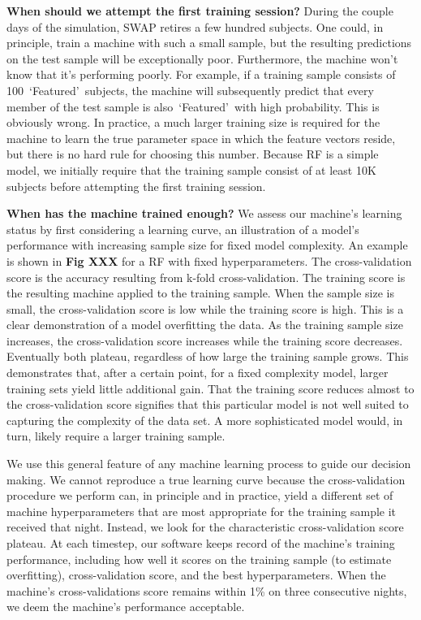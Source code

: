 \documentclass[twocolumn]{aastex6}
\newcommand{\feat}{`Featured'}
\begin{document}
\textbf{When should we attempt the first training session?}
During the couple days of the simulation, SWAP retires a few hundred subjects.
One could, in principle, train a machine with such a small sample, but the resulting
predictions on the test sample will be exceptionally poor. Furthermore, the machine
won't know that it's performing poorly. For example, if a training sample consists of
100~\feat~subjects, the machine will subsequently predict that every member of the 
test sample is also~\feat~with high probability. This is obviously wrong. 
In practice, a much larger training size is required for the machine to learn the 
true parameter space in which the feature vectors reside, but there is no hard rule
for choosing this number. Because RF is a simple model, we initially require that 
the training sample consist of at least 10K subjects before attempting the first training session. 

\textbf{When has the machine trained enough?} 
We assess our machine's learning status by first considering a learning curve, 
an illustration of a model's performance with increasing sample size for fixed 
model complexity. An example is shown in \textbf{Fig XXX} 
for a RF with fixed hyperparameters. The cross-validation score is the accuracy
resulting from k-fold cross-validation. The training score is the resulting machine
applied to the training sample. When the sample size is small, the cross-validation
score is low while the training score is high. This is a clear demonstration of a model
overfitting the data. As the training sample size 
increases, the cross-validation score increases while the training score decreases. 
Eventually both plateau, regardless of how large the training sample grows. 
This demonstrates that, after a certain point, for a fixed complexity model, 
larger training sets yield little additional gain. That the training
score reduces almost to the cross-validation score signifies that this particular
model is not well suited to capturing the complexity of the data set. 
A more sophisticated model would, in turn, likely require a larger training
sample. 

We use this general feature of any machine learning process to guide our 
decision making. We cannot reproduce a true learning curve
because the cross-validation procedure we perform can, in principle and in practice, 
yield a different set of machine hyperparameters that are most appropriate
for the training sample it received that night.  Instead, we look for the characteristic 
cross-validation score plateau. At each timestep, our software keeps record of 
the machine's training performance, including how well it scores on the 
training sample (to estimate overfitting), cross-validation score, 
and the best hyperparameters. When the machine's 
cross-validations score remains within 1\% on three consecutive nights, 
we deem the machine's performance acceptable. 
\end{document}
